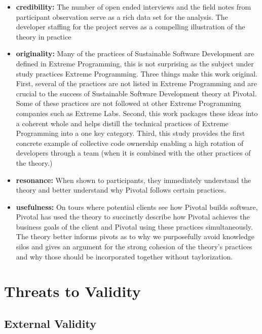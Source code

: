 \begin{table}[]
\begin{itemize}
\item 
\textbf{credibility:}  The number of open ended interviews and the field notes from participant observation serve as a rich data set for the analysis. The developer staffing for the project serves as a compelling illustration of the theory in practice

\item
\textbf{originality:} Many of the practices of Sustainable Software Development are defined in Extreme Programming, this is not surprising as the subject under study practices Extreme Programming. Three things make this work original. First, several of the practices are not listed in Extreme Programming and are crucial to the success of Sustainable Software Development theory at Pivotal. Some of these practices are not followed at other Extreme Programming companies such as Extreme Labs. Second, this work packages these ideas into a coherent whole and helps distill the technical practices of Extreme Programming into a one key category. Third, this study provides the first concrete example of collective code ownership enabling a high rotation of developers through a team (when it is combined with the other practices of the theory.)

\item
\textbf{resonance:} When shown to participants, they immediately understand the theory and better understand why Pivotal follows certain practices. 

\item
\textbf{usefulness:} 
On tours where potential clients see how Pivotal builds software, Pivotal has used the theory to succinctly describe how Pivotal achieves the business goals of the client and Pivotal using these practices simultaneously. The theory better informs pivots as to why we purposefully avoid knowledge silos and gives an argument for the strong cohesion of the theory's practices and why those should be incorporated together without taylorization. 
\end{itemize}

\section{Threats to Validity}

\subsection{External Validity}


\end{table}
